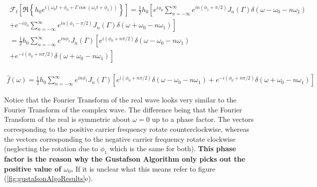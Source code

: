 \documentclass[onecolumn, groupedaddress, 10pt]{revtex4-1}
\begin{document}
\begin{align}
\begin{split}
\mathcal{F}_t \left[ \Re \left\{ h_0 e^{i\left( \omega_0 t + \phi_0 + \Gamma \cos( \omega_1 t + \phi_1 ) \right)} \right\} \right]
= \frac{1}{2} h_0 \left[ e^{ i\phi_0} \sum_{n=-\infty}^{\infty} e^{in(\phi_1 + \pi/2)} J_n(\Gamma)  \delta(\omega - \omega_0 - n\omega_1) \right.	\\
+ \left. e^{-i\phi_0} \sum_{n=-\infty}^{\infty} e^{in(\phi_1 - \pi/2)} J_n(\Gamma)  \delta(\omega + \omega_0 - n\omega_1) \right]					\\
= \frac{1}{2} h_0 \sum_{n=-\infty}^{\infty} e^{in\phi_1} J_n (\Gamma) \left[ e^{i(\phi_0 + n\pi/2)} \delta(\omega - \omega_0 - n\omega_1) \right.	\\
+ \left. e^{-i(\phi_0 + n\pi/2)} \delta(\omega + \omega_0 - n\omega_1) \right]
\end{split}
\end{align}




\begin{align}
\label{eqn:realFourierTransform}
\boxed{
\hat{f}(\omega) = 
\frac{1}{2} h_0 \sum_{n=-\infty}^{\infty} e^{in\phi_1} J_n (\Gamma) \left[ e^{i(\phi_0 + n\pi/2)} \delta(\omega - \omega_0 - n\omega_1)
+ e^{-i(\phi_0 + n\pi/2)} \delta(\omega + \omega_0 - n\omega_1) \right]
}
\end{align}

Notice that the Fourier Transform of the real wave looks very similar to the Fourier Transform of the complex wave.  The difference being that the Fourier Transform of the real is symmetric about $\omega=0$ up to a phase factor.  The vectors corresponding to the positive carrier frequency rotate counterclockwise, whereas the vectors corresponding to the negative carrier frequency rotate clockwise (neglecting the rotation due to $\phi_1$ which is the same for both).  \textbf{This phase factor is the reason why the Gustafson Algorithm only picks out the positive value of $\omega_0$.}  If it is unclear what this means refer to figure (\ref{fig:gustafsonAlgoResults}e).
\end{document}
